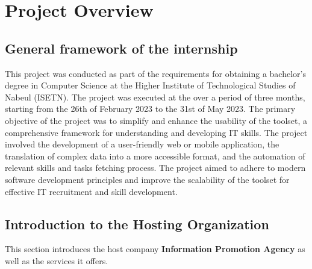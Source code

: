\chapter{Project Overview}
\minitoc
\newpage


\setcounter{secnumdepth}{2} %
\section{General framework of the internship}
This project was conducted as part of the requirements for obtaining a bachelor’s degree in Computer Science at the Higher Institute of Technological Studies of Nabeul (ISETN). The project was executed at the  over a period of three months, starting from the 26th of February 2023 to the 31st of May 2023. The primary objective of the project was to simplify and enhance the usability of the  toolset, a comprehensive framework for understanding and developing IT skills. The project involved the development of a user-friendly web or mobile application, the translation of complex  data into a more accessible format, and the automation of relevant skills and tasks fetching process. The project aimed to adhere to modern software development principles and improve the scalability of the  toolset for effective IT recruitment and skill development.


\section{Introduction to the Hosting Organization}
This section introduces the host company {\bf Information Promotion Agency} as well as the services it offers.

